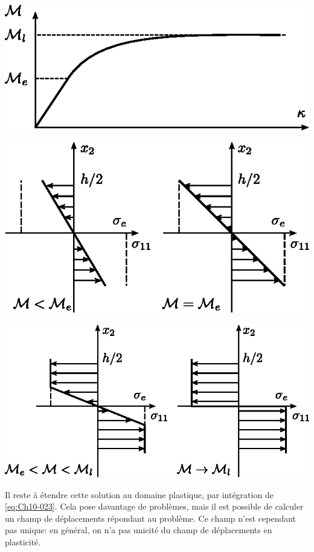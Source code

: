 \begin{center}
    \includegraphics{../images/T1_Ch10-13}
\end{center}
\begin{center}
    \includegraphics{../images/T1_Ch10-14a}

    \includegraphics{../images/T1_Ch10-14b}
\end{center}
Il reste à étendre cette solution au domaine plastique, par intégration de \eqref{eq:Ch10-023}.
Cela pose davantage de problèmes, mais il est possible de calculer un champ de déplacements répondant au problème.
Ce champ n'est cependant pas unique: en général, on n'a pas unicité du champ de déplacements en plasticité. 

